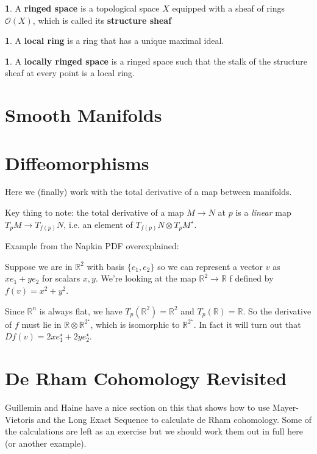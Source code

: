 \documentclass[oneside,english]{amsbook}
\numberwithin{section}{chapter}
\theoremstyle{plain}
\theoremstyle{definition}
\newtheorem{defn}[thm]{\protect\definitionname}
\providecommand{\definitionname}{Definition}
\begin{document}
			\begin{defn} 
				A \textbf{ringed space} is a topological space $X$ equipped with a sheaf of rings $\mathscr{O}(X)$, which is called its \textbf{structure sheaf}
			\end{defn}
			
			\begin{defn} 
				A \textbf{local ring} is a ring that has a unique maximal ideal.
			\end{defn}
			
			\begin{defn} 
				A \textbf{locally ringed space} is a ringed space such that the stalk of the structure sheaf at every point is a local ring.
			\end{defn}

		\section{Smooth Manifolds}

		\section{Diffeomorphisms}
		
			Here we (finally) work with the total derivative of a map between manifolds.
		
			Key thing to note: the total derivative of a map $M\to N$ at $p$ is a \emph{linear} map $T_pM\to T_{f(p)}N$, i.e. an element of $T_{f(p)}N\otimes T_pM^\star$. 
	
			Example from the Napkin PDF overexplained: 
			
			Suppose we are in $\mathbb{R}^2$ with basis $\{e_1, e_2\}$ so we can represent a vector $v$ as $xe_1 + ye_2$ for scalars $x, y$. We're looking at the map $\mathbb{R}^2\to \mathbb{R}$ f defined by $f(v) = x^2 + y^2$. 
			
			Since $\mathbb{R}^n$ is always flat, we have $T_p(\mathbb{R}^2) = \mathbb{R}^2$ and $T_p(\mathbb{R}) = \mathbb{R}$. So the derivative of $f$ must lie in $\mathbb{R}\otimes \mathbb{R}^2^\star$, which is isomorphic to $\mathbb{R}^2^\star$. In fact it will turn out that $Df(v) = 2xe_1^\star + 2ye_2^\star$.


		\section{De Rham Cohomology Revisited}
		
			Guillemin and Haine have a nice section on this that shows how to use Mayer-Vietoris and the Long Exact Sequence to calculate de Rham cohomology. Some of the calculations are left as an exercise but we should work them out in full here (or another example).
\end{document}
